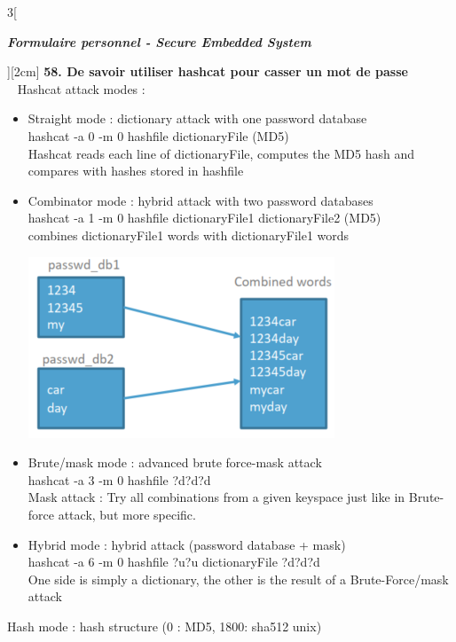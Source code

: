 \begin{multicols}{3}[\centerline{ \large\em \textbf{Formulaire personnel - Secure Embedded System}}][2cm]
\textbf{58. De savoir utiliser hashcat pour casser un mot de passe\\}~
Hashcat attack modes :
\begin{itemize}
\item Straight mode : dictionary attack with one password database\\
hashcat -a 0 -m 0 hashfile dictionaryFile (MD5)\\
Hashcat reads each line of dictionaryFile, computes the MD5 hash and compares with hashes stored in hashfile
\item Combinator mode : hybrid attack with two password databases\\
hashcat -a 1 -m 0 hashfile dictionaryFile1 dictionaryFile2 (MD5)\\
combines dictionaryFile1 words with dictionaryFile1 words\\
\begin{minipage}{\linewidth}
	\centering
    \includegraphics[width =0.4\columnwidth]{images/41.png}
\end{minipage}
\item Brute/mask mode : advanced brute force-mask attack\\
 hashcat -a 3 -m 0 hashfile ?d?d?d\\
Mask attack : Try all combinations from a given keyspace just like in Brute-force attack, but more specific.
\item Hybrid mode :  hybrid attack (password database + mask)\\
hashcat -a 6 -m 0 hashfile ?u?u dictionaryFile ?d?d?d\\
One side is simply a dictionary, the other is the result of a Brute-Force/mask attack
\end{itemize} 
Hash mode : hash structure (0 : MD5, 1800: sha512 unix)\\
\vfill

\columnbreak


\end{multicols}
